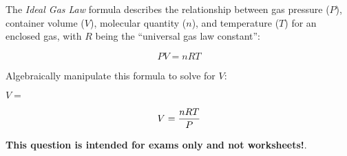 

The {\it Ideal Gas Law} formula describes the relationship between gas pressure ($P$), container volume ($V$), molecular quantity ($n$), and temperature ($T$) for an enclosed gas, with $R$ being the ``universal gas law constant'':

$$PV = nRT$$

Algebraically manipulate this formula to solve for $V$:

\vskip 20pt

$V = $







$$V = {nRT \over P}$$







{\bf This question is intended for exams only and not worksheets!}.



